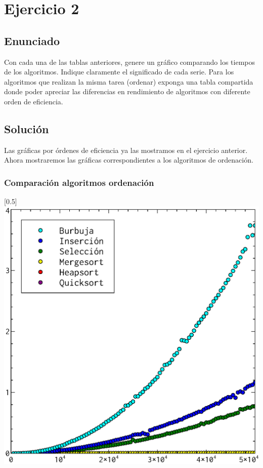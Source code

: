 \documentclass[compress]{beamer}
\begin{document}
\section{Ejercicio 2}
\subsection{Enunciado}

\begin{frame}
	Con cada una de las tablas anteriores, genere un gráfico comparando los tiempos  de
los algoritmos. Indique claramente el significado de cada serie. Para los algoritmos que
realizan la misma tarea (ordenar) exponga una tabla compartida donde poder apreciar las diferencias en rendimiento de algoritmos con diferente orden de
eficiencia.
\end{frame}
\subsection{Solución}
\begin{frame}
Las gráficas por órdenes de eficiencia ya las mostramos en el ejercicio anterior. Ahora mostraremos las gráficas correspondientes a los algoritmos de ordenación. %
\end{frame}

\begin{frame}
\frametitle{Comparación algoritmos ordenación}
	\begin{center}
\scalebox{0.53}[0.5]{
    \includegraphics[]{ord.eps}
}
\end{center}
\end{frame}
\end{document}
